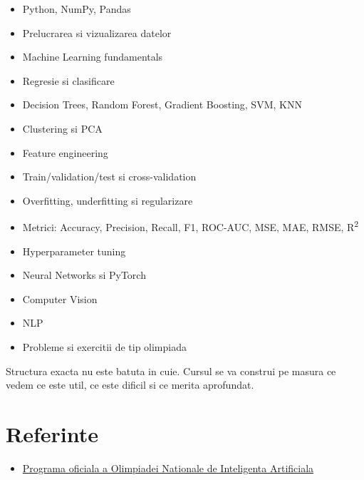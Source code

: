 \begin{itemize}
  \item Python, NumPy, Pandas
  \item Prelucrarea si vizualizarea datelor
  \item Machine Learning fundamentals
  \item Regresie si clasificare
  \item Decision Trees, Random Forest, Gradient Boosting, SVM, KNN
  \item Clustering si PCA
  \item Feature engineering
  \item Train/validation/test si cross-validation
  \item Overfitting, underfitting si regularizare
  \item Metrici: Accuracy, Precision, Recall, F1, ROC-AUC, MSE, MAE, RMSE, R\textsuperscript{2}
  \item Hyperparameter tuning
  \item Neural Networks si PyTorch
  \item Computer Vision
  \item NLP
  \item Probleme si exercitii de tip olimpiada
\end{itemize}

Structura exacta nu este batuta in cuie. Cursul se va construi pe masura
ce vedem ce este util, ce este dificil si ce merita aprofundat.

\section*{Referinte}

\begin{itemize}
  \item \href{https://platform.olimpiada-ai.ro/ro/roadmap/programa}{Programa oficiala a Olimpiadei Nationale de Inteligenta Artificiala}
\end{itemize}
